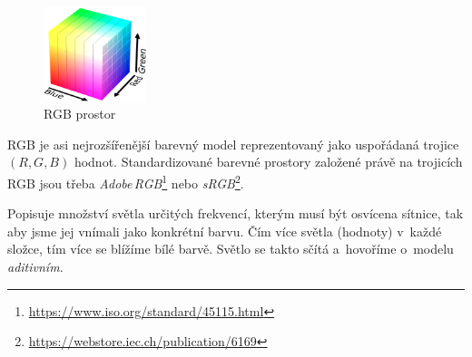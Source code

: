 \documentclass[11pt, a4paper, titlepage]{article}
\begin{document}
\begin{figure}
    \centering
    \vspace{-1cm}
    \includegraphics[width=3cm]{RGB_cube.png}
    \caption{RGB prostor \cite{wiki:RGB_color_model}}
\end{figure}

RGB je asi nejrozšířenější barevný model reprezentovaný jako uspořádaná trojice $(R,G,B)$ hodnot.
Standardizované barevné prostory založené právě na trojicích RGB jsou třeba \emph{Adobe\,RGB}\footnote{\url{https://www.iso.org/standard/45115.html}} nebo \emph{sRGB}\footnote{\url{https://webstore.iec.ch/publication/6169}}.

Popisuje množství světla určitých frekvencí, kterým musí být osvícena sítnice, tak aby jsme jej vnímali jako konkrétní barvu.
Čím více světla (hodnoty) v~každé složce, tím více se blížíme bílé barvě.
Světlo se takto sčítá a~hovoříme o~modelu \emph{aditivním}.
\end{document}
